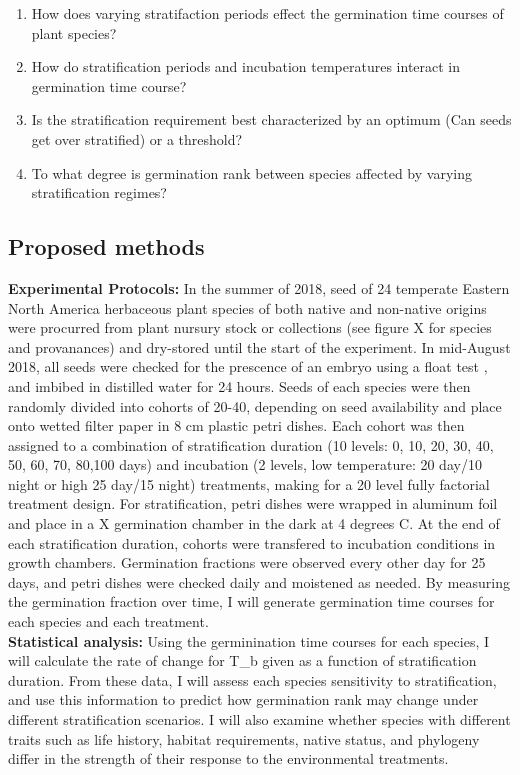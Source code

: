 \documentclass{article}\usepackage[]{graphicx}\usepackage[]{color}
\begin{document}
\begin{enumerate}
\item How does varying stratifaction periods effect the germination time courses of plant species?
\item How do stratification periods and incubation temperatures interact in germination time course?
\item Is the stratification requirement best characterized by an optimum (Can seeds get over stratified) or a threshold?
\item To what degree is germination rank between species affected by varying stratification regimes?
\end{enumerate}
\subsection*{Proposed methods}
\textbf{Experimental Protocols:} In the summer of 2018, seed of 24 temperate Eastern North America herbaceous plant species of both native and non-native origins were procurred from plant nursury stock or collections (see figure X for species and provanances) and dry-stored until the start of the experiment. In mid-August 2018, all seeds were checked for the prescence of an embryo using a float test \citep{Baskin_2014}, and imbibed in distilled water for 24 hours. Seeds of each species were then randomly divided into cohorts of 20-40, depending on seed availability and place onto wetted filter paper in 8 cm plastic petri dishes. Each cohort was then assigned to a combination of stratification duration (10 levels: 0, 10, 20, 30, 40, 50, 60, 70, 80,100 days) and incubation (2 levels, low temperature: 20 day/10 night or high 25 day/15 night) treatments, making for a 20 level fully factorial treatment design. For stratification, petri dishes were wrapped in aluminum foil and place in a X germination chamber in the dark at 4 degrees C. At the end of each stratification duration, cohorts were transfered to incubation conditions in growth chambers. Germination fractions were observed every other day for 25 days, and petri dishes were checked daily and moistened as needed. By measuring the germination fraction over time, I will generate germination time courses for each species and each treatment.\\
\textbf{Statistical analysis:} Using the germinination time courses for each species, I will calculate the rate of change for T_b given as a function of stratification duration. From these data, I will assess each species sensitivity to stratification, and use this information to predict how germination rank may change under different stratification scenarios. I will also examine whether species with different traits such as life history, habitat requirements, native status, and phylogeny differ in the strength of their response to the environmental treatments.\\
\end{document}
